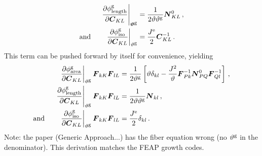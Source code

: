 \documentclass[10pt,letterpaper,oneside]{report}
\newcommand{\ten}[1]{\mbox{\boldmath $#1$}{}}
\newcommand{\tenf}[1]{\mbox{{\sffamily{\bfseries {#1}}}}}
\newcommand{\scas}[1]{\mbox{{\scriptsize{${\rm{#1}}$}}}{}}
\newcommand{\tens}[1]{\mbox{\boldmath{\scriptsize{$#1$}}}{}}
\begin{document}
\begin{itemize}
\begin{align}
\left. \frac{ \partial \phi^{\scas{g}}_{\scas{length}} }{ \partial \ten{C}_{KL} } \right|_{\tens{\vartheta}^{\scas{g}}}  
={}& \frac{1}{2 \vartheta \vartheta^{\scas{g}}} \ten{N}^0_{KL} \, , 
\\ \mbox{and} \qquad
\left. \frac{ \partial \phi^{\scas{g}}_{\scas{iso}} }{ \partial \ten{C}_{KL} } \right|_{\vartheta^{\scas{g}}} ={}&\frac{J^{\scas{e}}}{2} \ten{C}^{-1}_{KL} \, . 
\end{align}
This term can be pushed forward by itself for convenience, yielding 
\begin{align}
\left. \frac{ \partial \phi^{\scas{g}}_{\scas{area}} }{ \partial \ten{C}_{KL} } \right|_{\vartheta^{\scas{g}}} \ten{F}_{kK} \ten{F}_{lL} 
={}& \frac{1}{2 \vartheta^{\scas{g}}} \left[ \vartheta \delta_{kl} - \frac{J^2}{\vartheta} \ten{F}^{-1}_{Pk} \ten{N}^0_{PQ} \ten{F}^{-1}_{Ql} \right] \, , 
\\
\left. \frac{ \partial \phi^{\scas{g}}_{\scas{length}} }{ \partial \ten{C}_{KL} } \right|_{\vartheta^{\scas{g}}} \ten{F}_{kK} \ten{F}_{lL} 
={}& \frac{1}{2 \vartheta \vartheta^{\scas{g}}} \ten{N}_{kl} \, , 
\\ \mbox{and} \qquad
\left. \frac{\partial \phi^{\scas{g}}_{\scas{iso}} }{\partial \ten{C}_{KL}} \right|_{\vartheta^{\scas{g}}} \ten{F}_{kK} \ten{F}_{lL} 
={}& \frac{J^{\scas{e}}}{2} \delta_{kl} \, . 
\end{align}
Note: the paper (Generic Approach...) has the fiber equation wrong (no $\vartheta^{\scas{g}}$ in the denominator).  This derivation matches the FEAP growth codes.  


\end{itemize}
\end{document}
